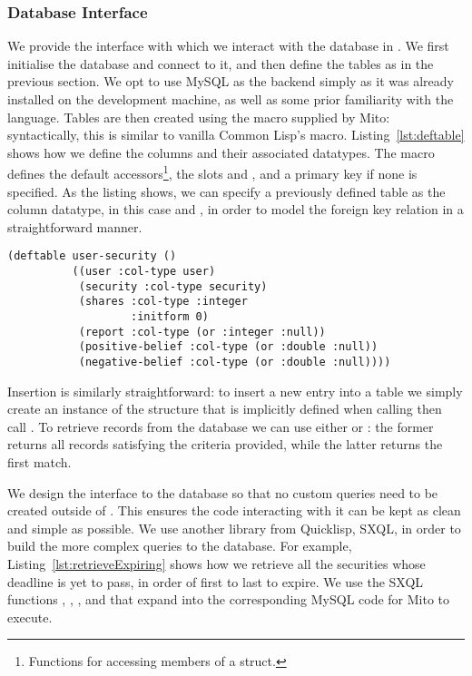 \subsubsection{Database Interface}

We provide the interface with which we interact with the database in
. We first initialise the database and connect to it, and
then define the tables as in the previous section. We opt to use MySQL as the
backend simply as it was already installed on the development machine, as well
as some prior familiarity with the language.  Tables are then created using the
 macro supplied by Mito: syntactically, this is similar to
vanilla Common Lisp's  macro.  Listing~\ref{lst:deftable} shows
how we define the columns and their associated datatypes. The macro defines the
default accessors\footnote{Functions for accessing members of a struct.}, the
slots  and , and a primary key  if
none is specified. As the listing shows, we can specify a previously defined
table as the column datatype, in this case  and , in
order to model the foreign key relation in a straightforward manner. 

\begin{lstlisting}[float,
	label={lst:deftable},
	caption={Defining the \code{USER-SECURITY} table in Mito}]
(deftable user-security ()
          ((user :col-type user)
           (security :col-type security)
           (shares :col-type :integer
                   :initform 0)
           (report :col-type (or :integer :null))
           (positive-belief :col-type (or :double :null))
           (negative-belief :col-type (or :double :null))))
\end{lstlisting}

Insertion is similarly straightforward: to insert a new entry into a table we
simply create an instance of the structure that is implicitly defined when calling
 then call . To retrieve records from the
database we can use either  or : the former
returns all records satisfying the criteria provided, while the latter returns
the first match.

We design the interface to the database so that no custom queries need to be
created outside of . This ensures the code interacting with
it can be kept as clean and simple as possible. We use another library from
Quicklisp, SXQL, in order to build the more complex queries to the database.
For example, Listing~\ref{lst:retrieveExpiring} shows how we retrieve all the
securities whose deadline is yet to pass, in order of first to last to expire.
We use the SXQL functions , \code{:>}, , and
 that expand into the corresponding MySQL code for Mito to execute.

